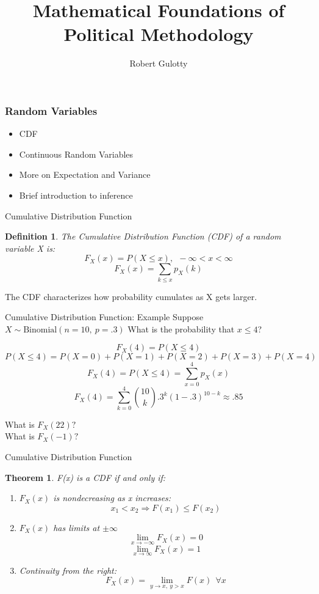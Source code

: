 \documentclass[handout]{beamer}
\title[PLSC 43401]{Mathematical Foundations of Political Methodology}
\author{Robert Gulotty}
\institute[Chicago]{University of Chicago}
\newtheorem{thm}{Theorem}
\newtheorem{defn}{Definition}
\numberwithin{equation}{section}
\begin{document}
\begin{frame}
\maketitle
\end{frame}


\begin{frame}
\frametitle{Random Variables}
\begin{itemize}
\item CDF
\item Continuous Random Variables
\item More on Expectation and Variance
\item Brief introduction to inference
\end{itemize}
\end{frame}


\begin{frame}{Cumulative Distribution Function}
\begin{defn}
The Cumulative Distribution Function (CDF) of a random variable X is:
$$F_X(x)=P(X\leq x),\ \ -\infty<x<\infty$$
$$F_X(x)=\sum_{k\leq x} p_X(k)$$
\end{defn}

The CDF characterizes how probability cumulates as X gets larger.
\end{frame}


\begin{frame}{Cumulative Distribution Function: Example}
Suppose $X\sim \text{Binomial}(n=10,\ p=.3)$
What is the probability that $x\leq 4$? 

$$F_X(4)=P(X\leq 4)$$\pause
$$P(X\leq 4)= P(X=0)+P(X=1)+P(X=2)+P(X=3) +P(X=4)$$\pause
$$F_X(4)=P(X\leq 4)= \sum_{x=0}^{4} p_X(x)$$\pause
$$F_X(4)=\sum_{k=0}^4{10\choose k} .3^k(1-.3)^{10-k}\approx .85$$\pause

What is $F_X(22)?$\\ \pause
What is $F_X(-1)?$
\end{frame}




\begin{frame}{Cumulative Distribution Function}

\begin{thm}
F(x) is a CDF if and only if:
\begin{enumerate}
\item  $F_X(x)$ is nondecreasing as x increases:
$$x_1<x_2\Rightarrow F(x_1)\leq F(x_2)$$
\item $F_X(x)$ has limits at $\pm \infty$ 
$$\lim_{x\rightarrow -\infty} F_X(x)=0$$
$$\lim_{x\rightarrow \infty} F_X(x)=1$$ 
\item Continuity from the right:
$$F_X(x)=\lim_{y\rightarrow x,\ y>x} F(x)\ \ \forall x$$
\end{enumerate}
\end{thm}
\end{frame}
\end{document}

